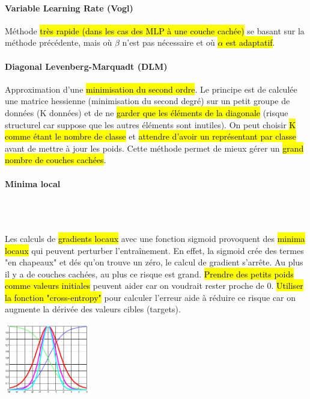 \documentclass[letterpaper, 12pt]{article}
\begin{document}
				\paragraph{Variable Learning Rate (Vogl)} Méthode \hl{très rapide (dans les cas des MLP à une couche cachée)} 
					se basant sur la méthode précédente, mais où $\beta$ n'est pas nécessaire et où \hl{$\alpha$ est adaptatif}. 
				\paragraph{Diagonal Levenberg-Marquadt (DLM)} Approximation d'une \hl{minimisation du second ordre}. Le principe est de 
					calculée une matrice hessienne (minimisation du second degré) sur un petit groupe de données (K données) et de ne 
					\hl{garder que les éléments de la diagonale} (risque structurel car suppose que les autres éléments sont inutiles). 
					On peut choisir \hl{K comme étant le nombre de classe} et\hl{ attendre d'avoir un représentant par classe} avant de 
					mettre à jour les poids. Cette méthode permet de mieux gérer un \hl{grand nombre de couches cachées}.
				\paragraph{Minima local} ~\\~\\
					\begin{minipage}{0.8\textwidth}
						Les calculs de \hl{gradients locaux} avec une fonction sigmoid provoquent des \hl{minima locaux} 
						qui peuvent perturber l'entraînement. En effet, la sigmoid crée des termes "en chapeaux" et dés qu'on trouve 
						un zéro, le calcul de gradient s'arrête. Au plus il y a de couches cachées, au plus ce risque est grand. 
						\hl{Prendre des petits poids comme valeurs initiales} peuvent aider car on voudrait rester proche de 0.
						\hl{Utiliser la fonction "cross-entropy"} pour calculer l'erreur aide à réduire ce risque car on augmente 
						la dérivée des valeurs cibles (targets).
					\end{minipage}\hfill
					\begin{minipage}{0.19\textwidth}
						\begin{center}
							\includegraphics[width=1.5in]{Images/sigmoid}
						\end{center}			
					\end{minipage}
\end{document}
